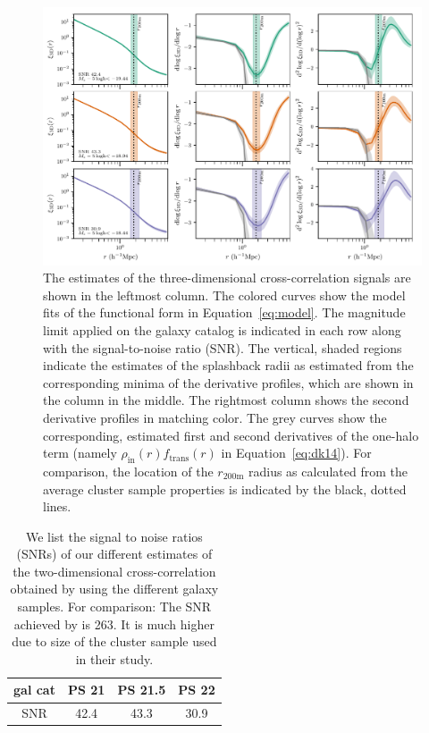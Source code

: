 \documentclass[iop, apjl, twocolappendix, numberedappendix]{emulateapj}
\begin{document}
\begin{figure}
    \centering
    \includegraphics[scale=0.85]{3D_graphs_with_spline_no_mc.pdf}
\caption{The estimates of the three-dimensional cross-correlation
signals are shown in the leftmost column. The colored curves show the
model fits of the functional form in Equation~\ref{eq:model}. The magnitude
limit applied on the galaxy catalog is indicated in each row along with 
the signal-to-noise ratio (SNR). The vertical, shaded regions indicate the 
estimates of the splashback radii as estimated from the corresponding minima 
of the derivative profiles, which are shown in the column in the middle. The
rightmost column shows the second derivative profiles in matching color.
The grey curves show the corresponding, estimated first and second derivatives of the 
one-halo term (namely $\rho_{\mathrm{in}}(r)f_{\mathrm{trans}}(r)$ in Equation~\ref{eq:dk14}).
For comparison, the location of the $r_{\mathrm{200m}}$ radius as calculated 
from the average cluster sample properties is indicated by the black, dotted
lines.}
   \label{fig:3D_graphs} 
\end{figure}


\begin{table}
    \centering
    \caption{We list the signal to noise ratios (SNRs) of our
different estimates of the two-dimensional cross-correlation
obtained by using the different galaxy samples. For comparison: The SNR
achieved by \citet{more2016detection} is 263. It is much higher
due to size of the cluster sample used in their study.}
    \label{tab:snr}
    \begin{tabular}{cccc}
    \hline
    gal cat & PS 21 & PS 21.5 & PS 22 \\ 
    \hline
    \hline
   SNR & 42.4 & 43.3 & 30.9 \\
    \hline
    \end{tabular} 
\end{table}
\end{document}
